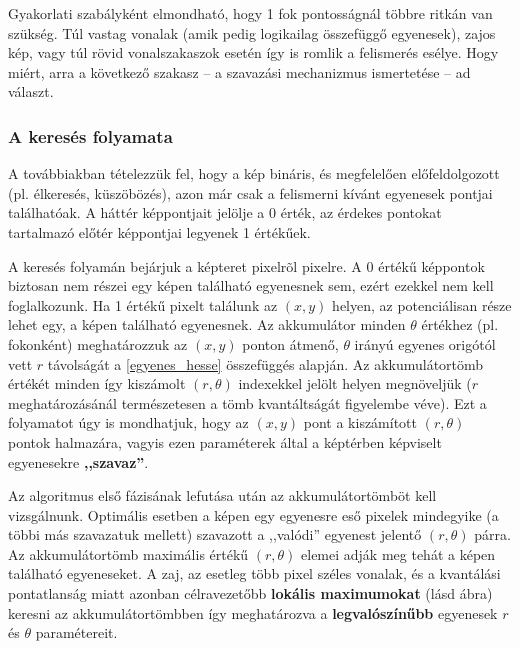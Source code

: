 Gyakorlati szabályként elmondható, hogy 1 fok pontosságnál többre ritkán van szükség. Túl vastag vonalak (amik pedig logikailag összefüggő egyenesek), zajos kép, vagy túl rövid vonalszakaszok esetén így is romlik a felismerés esélye. Hogy miért, arra a következő szakasz -- a szavazási mechanizmus ismertetése -- ad választ.

\subsubsection{A keresés folyamata}\label{sect:kereses_folyamata}

A továbbiakban tételezzük fel, hogy a kép bináris, és megfelelően előfeldolgozott (pl. élkeresés, küszöbözés), azon már csak a felismerni kívánt egyenesek pontjai találhatóak. A háttér képpontjait jelölje a 0 érték, az érdekes pontokat tartalmazó előtér képpontjai legyenek 1 értékűek.

A keresés folyamán bejárjuk a képteret pixelrõl pixelre. A 0 értékű képpontok biztosan nem részei egy képen található egyenesnek sem, ezért ezekkel nem kell foglalkozunk. Ha 1 értékű pixelt találunk az $ (x,y) $ helyen, az potenciálisan része lehet egy, a képen található egyenesnek. Az akkumulátor minden $ \theta $ értékhez (pl. fokonként) meghatározzuk az $ (x,y) $ ponton átmenő, $ \theta $ irányú egyenes origótól vett $ r $ távolságát a \eqref{egyenes_hesse} összefüggés alapján. Az akkumulátortömb értékét minden így kiszámolt $ (r,\theta) $ indexekkel jelölt helyen megnöveljük ($ r $ meghatározásánál természetesen a tömb kvantáltságát figyelembe véve). Ezt a folyamatot úgy is mondhatjuk, hogy az $ (x,y) $ pont a kiszámított $ (r, \theta) $ pontok halmazára, vagyis ezen paraméterek által a képtérben képviselt egyenesekre \textbf{,,szavaz''}.

Az algoritmus első fázisának lefutása után az akkumulátortömböt kell vizsgálnunk. Optimális esetben a képen egy egyenesre eső pixelek mindegyike (a többi más szavazatuk mellett) szavazott a ,,valódi'' egyenest jelentő $ (r, \theta) $ párra. Az akkumulátortömb maximális értékű $ (r, \theta) $ elemei adják meg tehát a képen található egyeneseket. A zaj, az esetleg több pixel széles vonalak, és a kvantálási pontatlanság miatt azonban célravezetőbb \textbf{lokális maximumokat} (lásd  ábra) keresni az akkumulátortömbben így meghatározva a \textbf{legvalószínűbb} egyenesek $ r $ és $ \theta $ paramétereit.

